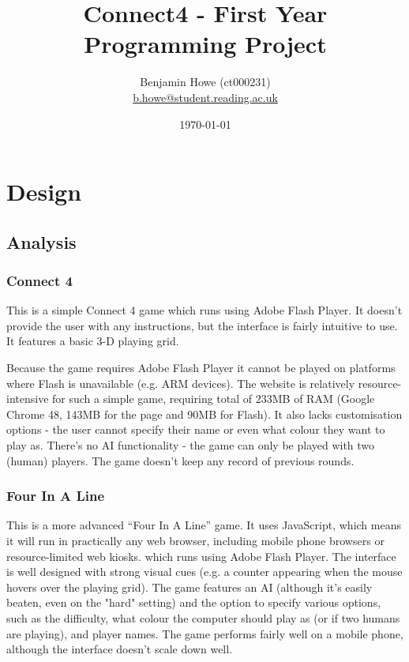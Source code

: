 \documentclass[11pt,onecolumn]{article}
\title{Connect4 - First Year Programming Project}
\author{
	Benjamin Howe (ct000231)\\
	\href{mailto:b.howe@student.reading.ac.uk}{b.howe@student.reading.ac.uk}
}
\date{\today}
\begin{document}
\maketitle

\tableofcontents

\section{Design}

\subsection{Analysis}

\subsubsection{Connect 4 \cite{OwensWorldConnect4}}

This is a simple Connect 4 game which runs using Adobe Flash Player. It doesn't provide the user with any instructions, but the interface is fairly intuitive to use. It features a basic 3-D playing grid.

Because the game requires Adobe Flash Player it cannot be played on platforms where Flash is unavailable (e.g. ARM devices). The website is relatively resource-intensive for such a simple game, requiring  total of 233MB of RAM (Google Chrome 48, 143MB for the page and 90MB for Flash). It also lacks customisation options - the user cannot specify their name or even what colour they want to play as. There's no AI functionality - the game can only be played with two (human) players. The game doesn't keep any record of previous rounds.

\subsubsection{Four In A Line \cite{MathsIsFunFourInALine}}

This is a more advanced ``Four In A Line'' game. It uses JavaScript, which means it will run in practically any web browser, including mobile phone browsers or resource-limited web kiosks. which runs using Adobe Flash Player. The interface is well designed with strong visual cues (e.g. a counter appearing when the mouse hovers over the playing grid). The game features an AI (although it's easily beaten, even on the "hard" setting) and the option to specify various options, such as the difficulty, what colour the computer should play as (or if two humans are playing), and player names. The game performs fairly well on a mobile phone, although the interface doesn't scale down well.
\end{document}
